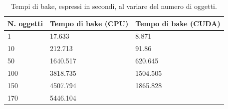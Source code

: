 \begin{table}[]
\centering
\caption[Performance al variare degli oggetti]{Tempi di bake, espressi in secondi, al variare del numero di oggetti.}
\begin{tabular}{|l|l|l}
\hline
\textbf{N. oggetti} & \textbf{Tempo di bake (CPU)} & \multicolumn{1}{l|}{\textbf{Tempo di bake (CUDA)}} \\ \hline
1 & 17.633 & \multicolumn{1}{l|}{8.871} \\ \hline
10 & 212.713 & \multicolumn{1}{l|}{91.86} \\ \hline
50 & 1640.517 & \multicolumn{1}{l|}{620.645} \\ \hline
100 & 3818.735 & \multicolumn{1}{l|}{1504.505} \\ \hline
150 & 4507.794 & \multicolumn{1}{l|}{1865.828} \\ \hline
170 & 5446.104 &  \\ \cline{1-2}
\end{tabular}
\label{table:per_num_ob}
\end{table}

